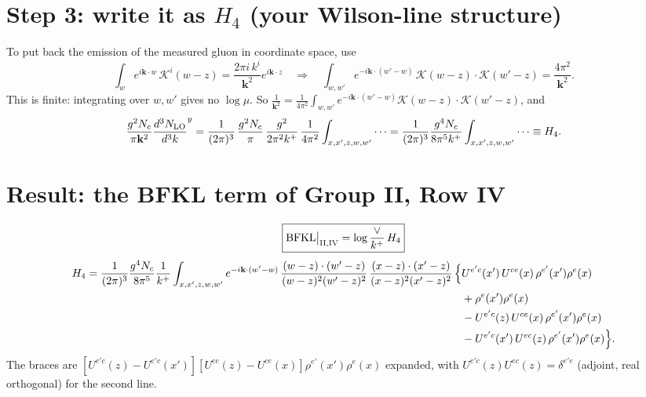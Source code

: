 \documentclass[10pt]{article}
\numberwithin{equation}{section}
\newcommand{\NLO}[1]{\frac{d^3N_{#1}}{d^3k}}
\begin{document}
\section{Step 3: write it as $H_4$ (your Wilson-line structure)}
To put back the emission of the measured gluon in coordinate space, use
\begin{equation}
\int_w e^{i\mathbf k\cdot w}\,\mathcal K^i(w-z)=\frac{2\pi i\,k^i}{\mathbf k^2}e^{i\mathbf k\cdot z}
\quad\Rightarrow\quad
\int_{w,w'}e^{-i\mathbf k\cdot(w'-w)}\,\mathcal K(w-z)\cdot\mathcal K(w'-z)=\frac{4\pi^2}{\mathbf k^2}.
\end{equation}
This is finite: integrating over $w,w'$ gives no $\log\mu$. So $\frac{1}{\mathbf k^2}=\frac{1}{4\pi^2}\int_{w,w'}e^{-i\mathbf k\cdot(w'-w)}\mathcal K(w-z)\cdot\mathcal K(w'-z)$, and
\begin{equation}
\frac{g^2N_c}{\pi\mathbf k^2}\NLO{\rm LO}^{y}=\frac{1}{(2\pi)^{3}}\,\frac{g^2N_c}{\pi}\,\frac{g^{2}}{2\pi^{2}k^{+}}\,\frac{1}{4\pi^2}\int_{x,x',z,w,w'}\dots
=\frac{1}{(2\pi)^{3}}\frac{g^{4}N_c}{8\pi^{5}k^{+}}\int_{x,x',z,w,w'}\dots\equiv H_4 .
\end{equation}

\section{Result: the BFKL term of Group II, Row IV}
\begin{equation}
\boxed{\text{BFKL}\big|_{\rm II,IV}=\log\frac{\vee}{k^+}\,H_4}
\end{equation}
\begin{align}
H_4=\frac{1}{(2\pi)^{3}}\frac{g^{4}N_c}{8\pi^{5}}\frac{1}{k^{+}}\int_{x,x',z,w,w'}e^{-i\mathbf k\cdot(w'-w)}\,
\frac{(w-z)\cdot(w'-z)}{(w-z)^2(w'-z)^2}\,\frac{(x-z)\cdot(x'-z)}{(x-z)^2(x'-z)^2}\,\Big\{&U^{e'c}(x')\,U^{ce}(x)\,\rho^{e'}(x')\rho^{e}(x)\notag\\
&+\rho^{e}(x')\rho^{e}(x)\notag\\
&-U^{e'c}(z)\,U^{ce}(x)\,\rho^{e'}(x')\rho^{e}(x)\notag\\
&-U^{e'c}(x')\,U^{ec}(z)\,\rho^{e'}(x')\rho^{e}(x)\Big\}.
\end{align}
The braces are $[U^{e'c}(z)-U^{e'c}(x')][U^{ec}(z)-U^{ce}(x)]\rho^{e'}(x')\rho^e(x)$ expanded, with $U^{e'c}(z)U^{ec}(z)=\delta^{e'e}$ (adjoint, real orthogonal) for the second line.
\end{document}
